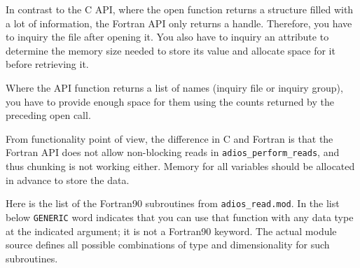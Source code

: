 In contrast to the C API, where the open function returns a structure filled with 
a lot of information, the Fortran API only returns a handle. Therefore, 
you have to inquiry the file after opening it.
You also have to inquiry an attribute to determine the memory 
size needed to store its value and allocate space for it before retrieving it. 

Where the API function returns a list of names (inquiry file or inquiry group), 
you have to provide enough space for them using the counts returned by the preceding 
open call. 

From functionality point of view, the difference in C and Fortran is that the 
Fortran API does not allow non-blocking reads in \verb+adios_perform_reads+, and thus
chunking is not working either. Memory for all variables should be allocated in advance 
to store the data.

Here is the list of the Fortran90 subroutines from \verb+adios_read.mod+. 
In the list below \verb+GENERIC+ word indicates that you 
can use that function with any data type at the indicated argument; it is not
a Fortran90 keyword. The actual module source defines all possible combinations 
of type and dimensionality for such subroutines. 

